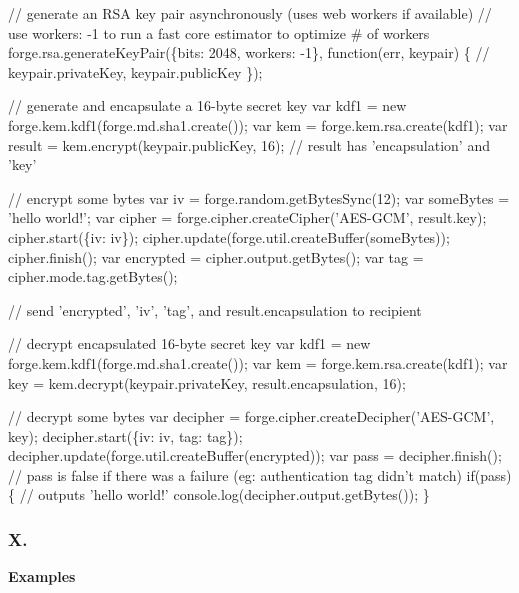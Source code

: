 \begin{DoxyCode}
// generate an RSA key pair asynchronously (uses web workers if available)
// use workers: -1 to run a fast core estimator to optimize # of workers
forge.rsa.generateKeyPair(\{bits: 2048, workers: -1\}, function(err, keypair) \{
  // keypair.privateKey, keypair.publicKey
\});

// generate and encapsulate a 16-byte secret key
var kdf1 = new forge.kem.kdf1(forge.md.sha1.create());
var kem = forge.kem.rsa.create(kdf1);
var result = kem.encrypt(keypair.publicKey, 16);
// result has 'encapsulation' and 'key'

// encrypt some bytes
var iv = forge.random.getBytesSync(12);
var someBytes = 'hello world!';
var cipher = forge.cipher.createCipher('AES-GCM', result.key);
cipher.start(\{iv: iv\});
cipher.update(forge.util.createBuffer(someBytes));
cipher.finish();
var encrypted = cipher.output.getBytes();
var tag = cipher.mode.tag.getBytes();

// send 'encrypted', 'iv', 'tag', and result.encapsulation to recipient

// decrypt encapsulated 16-byte secret key
var kdf1 = new forge.kem.kdf1(forge.md.sha1.create());
var kem = forge.kem.rsa.create(kdf1);
var key = kem.decrypt(keypair.privateKey, result.encapsulation, 16);

// decrypt some bytes
var decipher = forge.cipher.createDecipher('AES-GCM', key);
decipher.start(\{iv: iv, tag: tag\});
decipher.update(forge.util.createBuffer(encrypted));
var pass = decipher.finish();
// pass is false if there was a failure (eg: authentication tag didn't match)
if(pass) \{
  // outputs 'hello world!'
  console.log(decipher.output.getBytes());
\}
\end{DoxyCode}


\label{_x509}%
 \subsubsection*{X.}

{\bfseries Examples}


